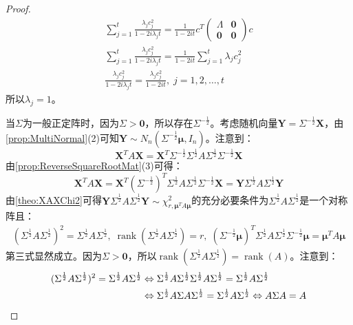 \begin{proof}
\begin{gather*}
		\sum_{j=1}^{t}\frac{\lambda_jc_j^2}{1-2i\lambda_jt}=\frac{1}{1-2it}c^T
		\begin{pmatrix}
			\varLambda & \mathbf{0} \\
			\mathbf{0} & \mathbf{0}
		\end{pmatrix}
		c \\
		\sum_{j=1}^{t}\frac{\lambda_jc_j^2}{1-2i\lambda_jt}=\frac{1}{1-2it}\sum_{j=1}^{t}\lambda_jc_j^2 \\
		\frac{\lambda_jc_j^2}{1-2i\lambda_jt}=\frac{\lambda_jc_j^2}{1-2it},\;j=1,2,\dots,t
	\end{gather*}
	所以$\lambda_j=1$。\par
	当$\Sigma$为一般正定阵时，因为$\Sigma>\mathbf{0}$，所以存在$\Sigma^{-\frac{1}{2}}$。考虑随机向量$\mathbf{Y}=\Sigma^{-\frac{1}{2}}\mathbf{X}$，由\cref{prop:MultiNormal}(2)可知$\mathbf{Y}\sim N_n(\Sigma^{-\frac{1}{2}}\boldsymbol{\mu},I_n)$。注意到：
	\begin{equation*}
		\mathbf{X}^TA\mathbf{X}=\mathbf{X}^T\Sigma^{-\frac{1}{2}}\Sigma
		^{\frac{1}{2}}A\Sigma^{\frac{1}{2}}\Sigma^{-\frac{1}{2}}\mathbf{X}
	\end{equation*}
	由\cref{prop:ReverseSquareRootMat}(3)可得：
	\begin{equation*}
		\mathbf{X}^TA\mathbf{X}=\mathbf{X}^T(\Sigma^{-\frac{1}{2}})^T\Sigma
		^{\frac{1}{2}}A\Sigma^{\frac{1}{2}}\Sigma^{-\frac{1}{2}}\mathbf{X}=\mathbf{Y}\Sigma
		^{\frac{1}{2}}A\Sigma^{\frac{1}{2}}\mathbf{Y}
	\end{equation*}
	由\cref{theo:XAXChi2}可得$\mathbf{Y}\Sigma
	^{\frac{1}{2}}A\Sigma^{\frac{1}{2}}\mathbf{Y}\sim\chi_{r,\boldsymbol{\mu}^TA\boldsymbol{\mu}}^2$的充分必要条件为$\Sigma
	^{\frac{1}{2}}A\Sigma^{\frac{1}{2}}$是一个对称阵且：
	\begin{gather*}
		(\Sigma
		^{\frac{1}{2}}A\Sigma^{\frac{1}{2}})^2=\Sigma
		^{\frac{1}{2}}A\Sigma^{\frac{1}{2}},\;
		\operatorname{rank}(\Sigma
		^{\frac{1}{2}}A\Sigma^{\frac{1}{2}})=r,\;
		(\Sigma^{-\frac{1}{2}}\boldsymbol{\mu})^T\Sigma^{\frac{1}{2}} A\Sigma^{\frac{1}{2}}\Sigma^{-\frac{1}{2}}\boldsymbol{\mu}=\boldsymbol{\mu}^TA\boldsymbol{\mu}
	\end{gather*}
	第三式显然成立。因为$\Sigma>\mathbf{0}$，所以$\operatorname{rank}(\Sigma
	^{\frac{1}{2}}A\Sigma^{\frac{1}{2}})=\operatorname{rank}(A)$。注意到：
	\begin{align*}
		(\Sigma
		^{\frac{1}{2}}A\Sigma^{\frac{1}{2}})^2=\Sigma
		^{\frac{1}{2}}A\Sigma^{\frac{1}{2}}&\Leftrightarrow
		\Sigma
		^{\frac{1}{2}}A\Sigma^{\frac{1}{2}}\Sigma
		^{\frac{1}{2}}A\Sigma^{\frac{1}{2}}=\Sigma
		^{\frac{1}{2}}A\Sigma^{\frac{1}{2}} \\
		&\Leftrightarrow
		\Sigma^{\frac{1}{2}}A\Sigma A\Sigma^{\frac{1}{2}}=\Sigma
		^{\frac{1}{2}}A\Sigma^{\frac{1}{2}}\Leftrightarrow
		A\Sigma A=A\qedhere
	\end{align*}
\end{proof}
